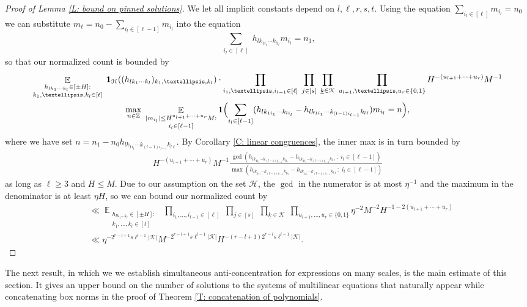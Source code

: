\documentclass[11pt]{amsart}
\theoremstyle{definition}
\DeclareMathOperator*{\E}{\mathbb{E}}
\newcommand{\Z}{{\mathbb Z}}
\newcommand{\CH}{{\mathcal H}}
\newcommand{\CK}{{\mathcal K}}
\newcommand{\uk}{{\underline{k}}}
\newcommand{\inv}{^{-1}}
\newcommand{\Bigbrac}[1]{\Bigl( #1 \Bigr)}
\begin{document}
\begin{proof}[Proof of Lemma \ref{L: bound on pinned solutions}]
    We let all implicit constants depend on $l, \ell, r, s, t$.
    Using the equation $\sum\limits_{i_l\in[\ell]}{m}_{i_l} = n_{0}$ we can substitute $m_{\ell} = n_{0} - \sum\limits_{i_l\in[\ell-1]}{m}_{i_l}$ into the equation $$\sum\limits_{\substack{i_l\in[\ell]}} h_{lk_{1i_1}\cdots k_{li_l}} {m}_{i_l} = n_{1},$$ so that our normalized count is bounded by
        \begin{multline*}
        \E_{\substack{h_{lk_1\cdots k_l}\in[\pm H]:\\ k_1, \ldots, k_l\in[t]}}\; \mathbf{1}_{\CH}((h_{lk_1\cdots k_l})_{k_1, \ldots, k_l})\cdot \prod_{i_1, \ldots, i_{l-1}\in[\ell]}\;\prod_{j\in[s]}\;\prod_{\uk\in\CK}\; \prod_{u_{l+1}, \ldots, u_r\in\{0,1\}}  H^{-(u_{l+1}+\cdots + u_r)} M\inv\\  \max_{\substack{n\in\Z}}\;
        \E_{\substack{|m_{i_l}|\leq H^{u_{l+1}+\cdots + u_r} M:\\ i_l\in[\ell-1]}} \mathbf{1}\Bigbrac{\sum\limits_{i_l\in[\ell-1]}(h_{lk_{1i_1}\cdots k_{li_l}}- h_{lk_{1i_1}\cdots k_{(l-1)i_{l-1}}k_{l\ell}})m_{i_l} = n},
    \end{multline*}
    where we have set $n=n_1 - n_0 h_{lk_{1i_1}\cdots k_{(l-1)i_{l-1}}k_{l\ell}}$. By Corollary \ref{C: linear congruences}, the inner max is in turn bounded by
    \begin{multline*}
        H^{-(u_{l+1}+\cdots + u_r)} M^{-1}\frac{\gcd(h_{lk_{1i_1}\cdots k_{(l-1)i_{l-1}}k_{l i_l}}- h_{lk_{1i_1}\cdots k_{(l-1)i_{l-1}}k_{l\ell}}:\; i_l\in[\ell-1])}{\max(h_{lk_{1i_1}\cdots k_{(l-1)i_{l-1}}k_{l i_l}}- h_{lk_{1i_1}\cdots k_{(l-1)i_{l-1}}k_{l\ell}}:\; i_l\in[\ell-1])}
    \end{multline*}    
    as long as $\ell\geq 3$ and $H \le M$. Due to our assumption on the set $\CH$, the $\gcd$ in the numerator is at most $\eta\inv$ and the maximum in the denominator is at least $\eta H$, so we can bound our normalized count by
    \begin{align*}
        &\ll\E_{\substack{h_{lk_1\cdots k_l}\in[\pm H]:\\ k_1, \ldots, k_l\in[t]}}\; \prod_{i_1, \ldots, i_{l-1}\in[\ell]}\;\prod_{j\in[s]}\;\prod_{\uk\in\CK}\; \prod_{u_{l+1}, \ldots, u_r\in\{0,1\}}\eta^{-2}M^{-2} H^{-1-2(u_{l+1}+\cdots + u_r)} \\
        &\ll \eta^{-2^{r-l+1}s\ell^{l-1}|\CK|}  M^{-2^{r-l+1}s\ell^{l-1}|\CK|} H^{-(r-l+1)2^{r-l}s\ell^{l-1}|\CK|}.
    \end{align*}
\end{proof}
    The next result, in which we we establish simultaneous anti-concentration for expressions on many scales, is the main estimate of this section. It gives an upper bound on the number of solutions to the systems of multilinear equations that naturally appear while concatenating box norms in the proof of Theorem \ref{T: concatenation of polynomials}.
\end{document}
